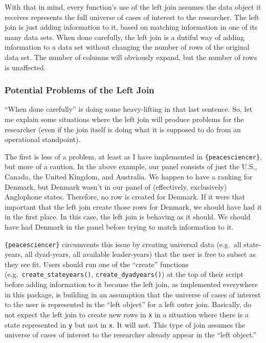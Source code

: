 \documentclass[
  11pt,
]{article}
\begin{document}
With that in mind, every function's use of the left join assumes the data object it receives represents the full universe of cases of interest to the researcher. The left join is just adding information to it, based on matching information in one of its many data sets. When done carefully, the left join is a dutiful way of adding information to a data set without changing the number of rows of the original data set. The number of columns will obviously expand, but the number of rows is unaffected.

\hypertarget{potential-problems-of-the-left-join}{%
\subsubsection{Potential Problems of the Left Join}\label{potential-problems-of-the-left-join}}

``When done carefully'' is doing some heavy-lifting in that last sentence. So, let me explain some situations where the left join will produce problems for the researcher (even if the join itself is doing what it is supposed to do from an operational standpoint).

The first is less of a problem, at least as I have implemented in \texttt{\{peacesciencer\}}, but more of a caution. In the above example, our panel consists of just the U.S., Canada, the United Kingdom, and Australia. We happen to have a ranking for Denmark, but Denmark wasn't in our panel of (effectively, exclusively) Anglophone states. Therefore, no row is created for Denmark. If it were that important that the left join create those rows for Denmark, we should have had it in the first place. In this case, the left join is behaving as it should. We should have had Denmark in the panel before trying to match information to it.

\texttt{\{peacesciencer\}} circumvents this issue by creating universal data (e.g.~all state-years, all dyad-years, all available leader-years) that the user is free to subset as they see fit. Users should run one of the ``create'' functions (e.g.~\texttt{create\_stateyears()}, \texttt{create\_dyadyears()}) at the top of their script before adding information to it because the left join, as implemented everywhere in this package, is building in an assumption that the universe of cases of interest to the user is represented in the ``left object'' for a left outer join. Basically, do not expect the left join to create new rows in \texttt{x} in a situation where there is a state represented in \texttt{y} but not in \texttt{x}. It will not. This type of join assumes the universe of cases of interest to the researcher already appear in the ``left object.''
\end{document}

